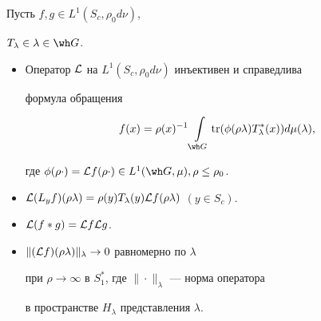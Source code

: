 \begin{prop}


Пусть $f,g\in L^1(S_c,\rho_0d\nu)$,


$T_\lambda\in\lambda\in\wh G$.


\begin{itemize}


\item[1)]


Оператор ${\cal L}$ на $L^1(S_c,\rho_0d\nu)$ инъективен и справедлива


формула обращения


$$


f(x)=\rho(x)^{-1}\int\limits_{\wh G}


\tr(\phi(\rho\lambda)T^*_\lambda(x))d\mu(\lambda),


$$


где $\phi(\rho\cdot)={\cal L}f(\rho\cdot)\in L^1(\wh G,\mu), \rho\leq


\rho_0$.


\item[2)] $ {\cal L}(L_yf)(\rho\lambda)=


\rho(y)T_\lambda(y){\cal L}f(\rho\lambda)$ $(y\in S_c)$.


\item[3)] $ {\cal L}(f\ast g)={\cal L}f{\cal L}g$.


\item[4)] $\|({\cal L}f)(\rho\lambda)\|_\lambda\to 0$ равномерно по $\lambda$


при $\rho\to\infty$ в $S^*_1$, где $\|\cdot \|_\lambda$ --- норма оператора


в пространстве $H_\lambda$ представления $\lambda$.


\end{itemize}


\end{prop}





